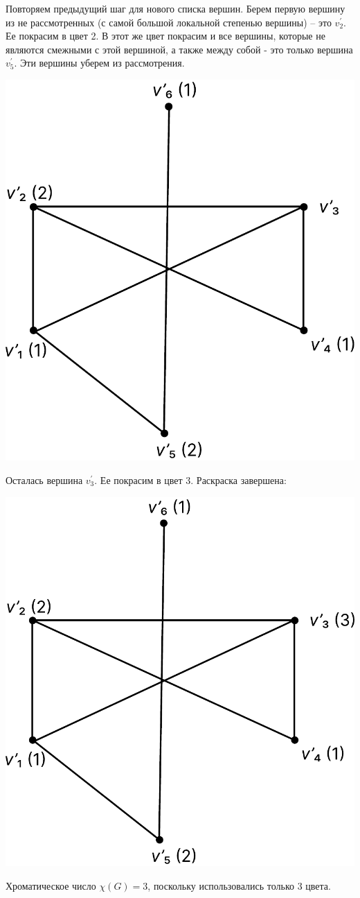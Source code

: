 \documentclass[12pt]{article}
\begin{document}
Повторяем предыдущий шаг для нового списка вершин. Берем
первую вершину из не рассмотренных (с самой большой локальной
степенью вершины) – это $v_2^'$. Ее покрасим в цвет 2. В этот же цвет
покрасим и все вершины, которые не являются смежными с этой
вершиной, а также между собой - это только вершина $v_5^'$.
Эти вершины уберем из рассмотрения.

\begin{center}
	\includegraphics[scale=.8]{20_5.pdf}
\end{center}

Осталась вершина $v_3^'$. Ее покрасим в цвет 3. Раскраска завершена:

\begin{center}
	\includegraphics[scale=.8]{20_6.pdf}
\end{center}

Хроматическое число $\chi (G) = 3$, поскольку использовались только 3
цвета.
\end{document}
